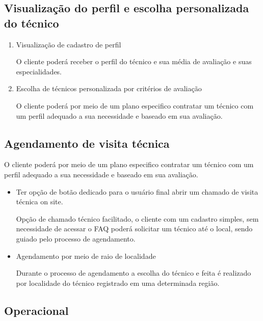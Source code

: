 \subsection{Visualização do perfil e escolha personalizada do técnico}

\begin{enumerate}
	
	\item Visualização de cadastro de perfil
	
	O cliente poderá receber o perfil do técnico e sua média de avaliação e suas especialidades.
	
	\item Escolha de técnicos personalizada por critérios de avaliação
	
	O cliente poderá por meio de um plano especifico contratar um técnico com um perfil adequado a sua necessidade e baseado em sua avaliação.
	
\end{enumerate}

\subsection{Agendamento de visita técnica}

O cliente poderá por meio de um plano especifico contratar um técnico com um perfil adequado a sua necessidade e baseado em sua avaliação.

\begin{itemize}
	
	\item Ter opção de botão dedicado para o usuário final abrir um chamado de visita técnica on site.
	
	Opção de chamado técnico facilitado, o cliente com um cadastro simples, sem necessidade de acessar o FAQ poderá solicitar um técnico até o local, sendo guiado pelo processo de agendamento.
	
	\item Agendamento por meio de raio de localidade
	
	Durante o processo de agendamento a escolha do técnico e feita é realizado por localidade do técnico registrado em uma determinada região.
	
\end{itemize}

\subsection{Operacional}

